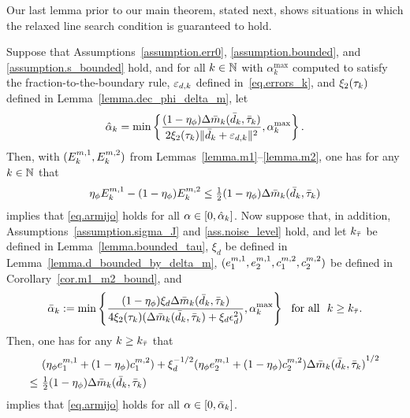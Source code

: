 Our last lemma prior to our main theorem, stated next, shows situations in which the relaxed line search condition is guaranteed to hold.

\begin{lemma}\label{lemma.lb_on_alpha_1}
  Suppose that Assumptions~\ref{assumption.err0}, \ref{assumption.bounded}, and \ref{assumption.s_bounded} hold, and for all $k \in \mathbb{N}$ with $\alpha_k^{\max}$ computed to satisfy the fraction-to-the-boundary rule, $\varepsilon_{d,k}$ defined in~\eqref{eq.errors_k}, and $\xi_2(\tau_k)$ defined in Lemma~\ref{lemma.dec_phi_delta_m}, let
  \begin{align}\label{eq.hat_alpha_k}
    {\hat \alpha}_k = \min \left \{\frac{(1 - \eta_\phi) \Delta {\bar m}_k({\bar d}_k, {\bar \tau}_k)}{2 \xi_2(\tau_k) \|{\bar d}_k + \varepsilon_{d,k}\|^2}, \alpha_k^{\max} \right\}.
  \end{align}
  Then, with $(E_k^{m, 1}, E_k^{m, 2})$ from Lemmas~\ref{lemma.m1}--\ref{lemma.m2}, one has for any $k \in \mathbb{N}$ that
  \begin{align}\label{eq.err_cond_0}
    \eta_\phi E_k^{m, 1} - (1 - \eta_\phi) E_k^{m, 2} \leq \tfrac{1}{2} (1 - \eta_\phi) \Delta {\bar m}_k({\bar d}_k, {\bar \tau}_k)
  \end{align}
  implies that \eqref{eq.armijo} holds for all $\alpha \in [0,{\hat \alpha}_k]$.  Now suppose that, in addition, Assumptions~\ref{assumption.sigma_J} and \ref{ass.noise_level} hold, and let $k_{{\bar \tau}}$ be defined in Lemma~\ref{lemma.bounded_tau}, $\xi_d$ be defined in Lemma~\ref{lemma.d_bounded_by_delta_m}, $(e_1^{m, 1}, e_2^{m, 1}, c_1^{m, 2}, c_2^{m, 2})$ be defined in Corollary~\ref{cor.m1_m2_bound}, and
  \begin{align}\label{eq.bar_alpha_k}
    {\bar \alpha}_k := \min \left \{ \frac{(1 - \eta_\phi) {\xi_d} \Delta {\bar m}_k({\bar d}_k, {\bar \tau}_k)}{ 4 \xi_2(\tau_k) (\Delta {\bar m}_k({\bar d}_k, {\bar \tau}_k) + \xi_d\epsilon_d^2) }, \alpha_k^{\max} \right\}\ \ \text{for all}\ \ k \geq k_{{\bar \tau}}.
  \end{align}
  Then, one has for any $k \geq k_{{\bar \tau}}$ that
  \begin{align}
    &\ (\eta_{\phi} e_1^{m, 1} + (1 - \eta_{\phi}) c_1^{m, 2}) + \xi_d^{-1/2} (\eta_{\phi} e_2^{m, 1} + (1 - \eta_{\phi}) c_2^{m, 2} ) {\Delta {\bar m}_k({\bar d}_k, {\bar \tau}_k) }^{1/2} \nonumber \\
    \leq&\ \tfrac{1}{2} (1 - \eta_\phi) \Delta {\bar m}_k({\bar d}_k, {\bar \tau}_k) \label{eq.err_cond_rho1}
 \end{align}
  implies that \eqref{eq.armijo} holds for all $\alpha \in [0,{\bar \alpha}_k]$.
\end{lemma}
